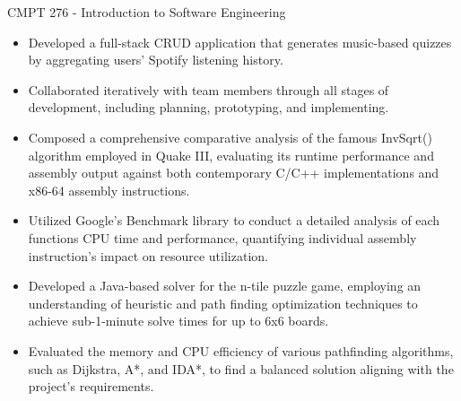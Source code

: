 \documentclass[10pt,a4paper,ragged2e,withhyper]{altacv}
\begin{document}
\begin{paracol}{2}
        \vspace{-2em}
             {CMPT 276 - Introduction to \medskip Software Engineering}
            \vspace{-0.5em}
            \begin{itemize}
            \item Developed a full-stack CRUD application that generates music-based quizzes by aggregating users’ Spotify listening history.
            \item Collaborated iteratively with team members through all stages of development, including planning, prototyping, and implementing.
            \end{itemize}
            \vspace{-0.5em}
            \divider
            \vspace{0.5em}
            \vspace{-0.5em}
            \begin{itemize}
            \item Composed a comprehensive comparative analysis of the famous InvSqrt() algorithm employed in Quake III, evaluating its runtime performance and assembly output against both contemporary C/C++ implementations and x86-64 assembly instructions.
            \item Utilized Google's Benchmark library to conduct a detailed analysis of each functions CPU time and performance, quantifying individual assembly instruction's impact on resource utilization.
            \end{itemize}
            \vspace{-0.5em}
            \divider
            \vspace{0.5em}
            \vspace{-0.5em}
            \begin{itemize}
            \item Developed a Java-based solver for the n-tile puzzle game, employing an understanding of heuristic and path finding optimization techniques to achieve sub-1-minute solve times for up to 6x6 boards.
            \item Evaluated the memory and CPU efficiency of various pathfinding algorithms, such as Dijkstra, A*, and IDA*, to find a balanced solution aligning with the project's requirements.
            \end{itemize}
        

\end{paracol}
\end{document}
